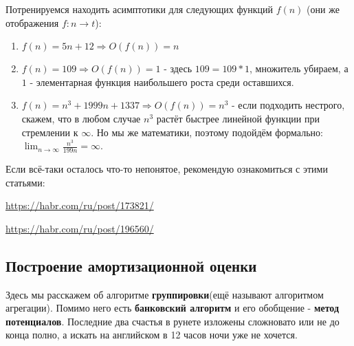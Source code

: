 Потренируемся находить асимптотики для следующих функций $f(n)$ (они же отображения $f: n\rightarrow t$):
\begin{enumerate}
    \item $f(n) = 5n + 12 \Rightarrow O(f(n)) = n$
    \item $f(n) = 109 \Rightarrow O(f(n)) = 1$ - здесь $109 = 109 * 1$, множитель убираем, а $1$ - элементарная функция наибольшего роста среди оставшихся.
    \item $f(n) = n^3 + 1999n + 1337 \Rightarrow O(f(n)) = n^3$ - если подходить нестрого, скажем, что в любом случае $n^3$ растёт быстрее линейной функции при стремлении к $\infty$. Но мы же математики, поэтому подойдём формально: \large{ $\lim_{n \to \infty} \frac{n^3}{199n} = \infty$}.
\end{enumerate}
Если всё-таки осталось что-то непонятое, рекомендую ознакомиться с этими статьями:

\url{https://habr.com/ru/post/173821/}

\url{https://habr.com/ru/post/196560/}

\subsection{Построение амортизационной оценки}
\begin{notice}
Здесь мы расскажем об алгоритме \textbf{группировки}(ещё называют алгоритмом агрегации). Помимо него есть \textbf{банковский алгоритм} и его обобщение - \textbf{метод потенциалов}. Последние два счастья в рунете изложены сложновато или не до конца полно, а искать на английском в 12 часов ночи уже не хочется.
\end{notice}


